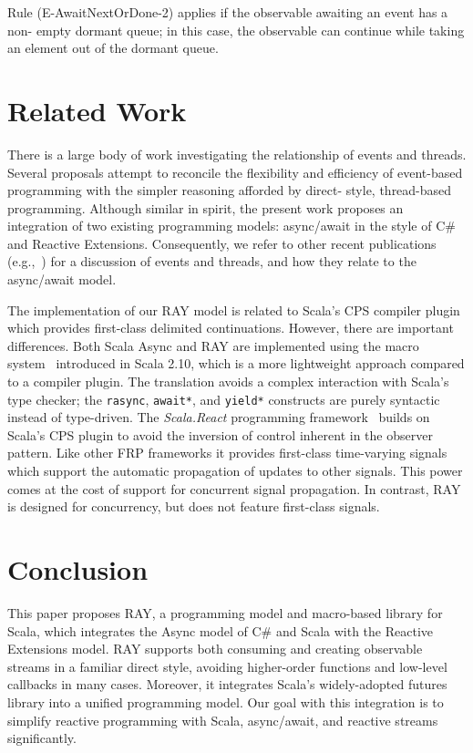 \documentclass{acm_proc_article-sp}
\begin{document}
Rule (E-AwaitNextOrDone-2) applies if the observable awaiting an event has a non-
empty dormant queue; in this case, the observable can continue while taking an
element out of the dormant queue.

\section{Related Work}

There is a large body of work investigating the relationship of events and
threads. Several proposals attempt to reconcile the flexibility and efficiency
of event-based programming with the simpler reasoning afforded by direct-
style, thread-based programming. Although similar in spirit, the present work
proposes an integration of two existing programming models: async/await in the
style of C\# and Reactive Extensions. Consequently, we refer to other recent
publications (e.g.,~\cite{FormalizingAsync}) for a discussion of events and
threads, and how they relate to the async/await model.

The implementation of our RAY model is related to Scala's CPS compiler
plugin~\cite{RompfMO09} which provides first-class delimited continuations.
However, there are important differences. Both Scala Async and RAY are
implemented using the macro system~\cite{burmako13} introduced in Scala 2.10,
which is a more lightweight approach compared to a compiler plugin. The
translation avoids a complex interaction with Scala's type checker; the
\verb|rasync|, \verb|await*|, and \verb|yield*| constructs are purely
syntactic instead of type-driven. The {\em Scala.React} programming
framework~\cite{MaierO13} builds on Scala's CPS plugin to avoid the inversion
of control inherent in the observer pattern. Like other FRP frameworks it
provides first-class time-varying signals which support the automatic
propagation of updates to other signals. This power comes at the cost of
support for concurrent signal propagation. In contrast, RAY is designed for
concurrency, but does not feature first-class signals.


\section{Conclusion}

This paper proposes RAY, a programming model and macro-based library for
Scala, which integrates the Async model of C\# and Scala with the Reactive
Extensions model. RAY supports both consuming and creating observable streams
in a familiar direct style, avoiding higher-order functions and low-level
callbacks in many cases. Moreover, it integrates Scala's widely-adopted
futures library into a unified programming model. Our goal with this
integration is to simplify reactive programming with Scala, async/await, and
reactive streams significantly.
\end{document}
